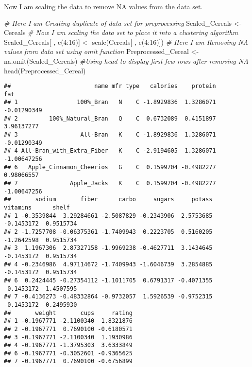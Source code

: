 \documentclass[
]{article}
\newenvironment{Shaded}{\begin{snugshade}}{\end{snugshade}}
\newcommand{\CommentTok}[1]{\textcolor[rgb]{0.56,0.35,0.01}{\textit{#1}}}
\newcommand{\DecValTok}[1]{\textcolor[rgb]{0.00,0.00,0.81}{#1}}
\newcommand{\FunctionTok}[1]{\textcolor[rgb]{0.00,0.00,0.00}{#1}}
\newcommand{\NormalTok}[1]{#1}
\newcommand{\OtherTok}[1]{\textcolor[rgb]{0.56,0.35,0.01}{#1}}
\newcommand{\SpecialCharTok}[1]{\textcolor[rgb]{0.00,0.00,0.00}{#1}}
\begin{document}
Now I am scaling the data to remove NA values from the data set.

\begin{Shaded}
\begin{Highlighting}[]
\CommentTok{\# Here I am Creating duplicate of data set for preprocessing}
\NormalTok{Scaled\_Cereals }\OtherTok{\textless{}{-}}\NormalTok{ Cereals}
\CommentTok{\# Now I am scaling the data set to place it into a clustering algorithm}
\NormalTok{Scaled\_Cereals[ , }\FunctionTok{c}\NormalTok{(}\DecValTok{4}\SpecialCharTok{:}\DecValTok{16}\NormalTok{)] }\OtherTok{\textless{}{-}} \FunctionTok{scale}\NormalTok{(Cereals[ , }\FunctionTok{c}\NormalTok{(}\DecValTok{4}\SpecialCharTok{:}\DecValTok{16}\NormalTok{)])}
\CommentTok{\# Here I am Removing NA values from data set using omit function}
\NormalTok{Preprocessed\_Cereal }\OtherTok{\textless{}{-}} \FunctionTok{na.omit}\NormalTok{(Scaled\_Cereals)}
\CommentTok{\#Using head to display first few rows after removing NA}
\FunctionTok{head}\NormalTok{(Preprocessed\_Cereal)}
\end{Highlighting}
\end{Shaded}

\begin{verbatim}
##                        name mfr type   calories    protein         fat
## 1                 100%_Bran   N    C -1.8929836  1.3286071 -0.01290349
## 2         100%_Natural_Bran   Q    C  0.6732089  0.4151897  3.96137277
## 3                  All-Bran   K    C -1.8929836  1.3286071 -0.01290349
## 4 All-Bran_with_Extra_Fiber   K    C -2.9194605  1.3286071 -1.00647256
## 6   Apple_Cinnamon_Cheerios   G    C  0.1599704 -0.4982277  0.98066557
## 7               Apple_Jacks   K    C  0.1599704 -0.4982277 -1.00647256
##       sodium       fiber      carbo     sugars     potass   vitamins      shelf
## 1 -0.3539844  3.29284661 -2.5087829 -0.2343906  2.5753685 -0.1453172  0.9515734
## 2 -1.7257708 -0.06375361 -1.7409943  0.2223705  0.5160205 -1.2642598  0.9515734
## 3  1.1967306  2.87327158 -1.9969238 -0.4627711  3.1434645 -0.1453172  0.9515734
## 4 -0.2346986  4.97114672 -1.7409943 -1.6046739  3.2854885 -0.1453172  0.9515734
## 6  0.2424445 -0.27354112 -1.1011705  0.6791317 -0.4071355 -0.1453172 -1.4507595
## 7 -0.4136273 -0.48332864 -0.9732057  1.5926539 -0.9752315 -0.1453172 -0.2495930
##       weight       cups     rating
## 1 -0.1967771 -2.1100340  1.8321876
## 2 -0.1967771  0.7690100 -0.6180571
## 3 -0.1967771 -2.1100340  1.1930986
## 4 -0.1967771 -1.3795303  3.6333849
## 6 -0.1967771 -0.3052601 -0.9365625
## 7 -0.1967771  0.7690100 -0.6756899
\end{verbatim}
\end{document}
